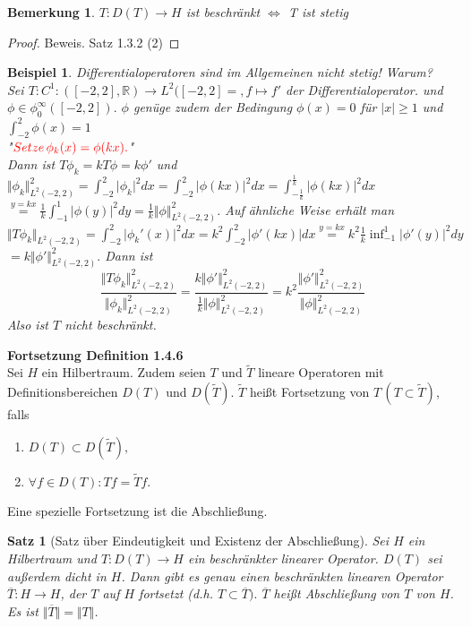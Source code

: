 \documentclass[12pt,titlepage]{article}
\newtheorem{bsp}[zahl]{Beispiel}
\newtheorem{bemerkung}[zahl]{Bemerkung}
\newtheorem{satz}[zahl]{Satz}
\numberwithin{equation}{section}
\begin{document}
\begin{bemerkung}
$T:D(T)\to H$ ist beschränkt $\Leftrightarrow$ T ist stetig
\end{bemerkung}
\begin{proof}
Beweis. Satz 1.3.2 (2)
\end{proof}
\begin{bsp}
Differentialoperatoren sind im Allgemeinen nicht stetig! Warum?\\
Sei $T:C^1:([-2,2],\mathbb{R})\to L^2([-2,2]=,f\mapsto f'$ der Differentialoperator. und $\phi \in \phi^{\infty}_0([-2,2]).$ $\phi$ genüge zudem der Bedingung $\phi (x)=0$ für $\vert x \vert \geq 1$ und $\int_{-2}^2\phi (x)=1$
\\"$\textcolor{red}{Setze \, \phi_k(x)=\phi(kx).}$"\\
Dann ist $T\phi_k=k T\phi=k\phi'$ und $\Vert \phi_k \Vert^2_{L^2(-2,2)}=\int_{-2}^2\vert \phi_k\vert^2dx=\int_{-2}^2\vert \phi(kx)\vert^2dx=\int_{-\frac{1}{k}}^{\frac{1}{k}}\vert \phi(kx)\vert^2dx$ $\overset{y=kx}{=}\frac{1}{k}\int_{-1}^1\vert \phi(y)\vert^2dy=\frac{1}{k}\Vert \phi \Vert_{L^2(-2,2)}^2$. Auf ähnliche Weise erhält man $\Vert T\phi_k\Vert_{L^2(-2,2)}=\int_{-2}^2\vert \phi_k'(x)\vert^2dx=k^2 \int_{-2}^2\vert \phi'(kx)\vert dx\overset{y=kx}{=}k^2\frac{1}{k}\inf_{-1}^1\vert \phi'(y)\vert^2dy$ \\$=k\Vert \phi' \Vert_{L^2(-2,2)}^2.$ Dann ist
\[
\frac{\Vert T\phi_k\Vert_{L^2(-2,2)}^2}{\Vert \phi_k \Vert_{L^2(-2,2)}^2}=\frac{k \Vert \phi'\Vert_{L^2(-2,2)}^2}{\frac{1}{k}\Vert \phi \Vert_{L^2(-2,2)}^2}=k^2\frac{\Vert\phi' \Vert_{L^2(-2,2)}^2}{\Vert \phi \Vert_{L^2(-2,2)}^2 }
\]
Also ist $T$ nicht beschränkt.
\end{bsp}
\textbf{Fortsetzung Definition 1.4.6}\\
Sei $H$ ein Hilbertraum. Zudem seien $T$ und $\tilde{T}$ lineare Operatoren mit Definitionsbereichen $D(T)$ und $D(\tilde{T}).$ $\tilde{T}$ heißt Fortsetzung von $T\, (T\subset \tilde{T})$, falls 
\begin{enumerate}
\item $D(T) \subset D(\tilde{T}),$
\item $\forall f \in D(T): Tf=\tilde{T}f.$
\end{enumerate} 
Eine spezielle Fortsetzung ist die Abschließung.
\begin{satz}[Satz über Eindeutigkeit und Existenz der Abschließung]
Sei $H$ ein Hilbertraum und $T:D(T)\to H$ ein beschränkter linearer Operator. $D(T)$ sei außerdem dicht in $H$. Dann gibt es genau einen beschränkten linearen Operator $\overline{T}:H\to H$, der $T$ auf $H$ fortsetzt (d.h. $T \subset \overline{T}).$ $\overline{T}$ heißt Abschließung von $T$ von $H$. Es ist $\Vert \overline{T} \Vert =\Vert T \Vert $.
\end{satz}
\end{document}
